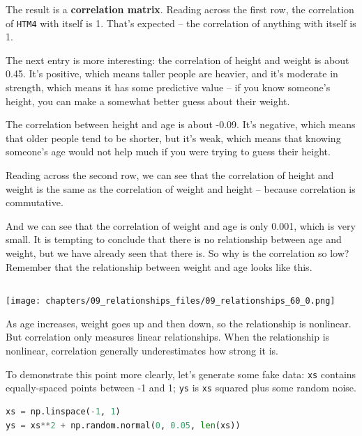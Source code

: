 The result is a \textbf{correlation matrix}. Reading across the first
row, the correlation of \passthrough{\lstinline!HTM4!} with itself is 1.
That's expected -- the correlation of anything with itself is 1.

The next entry is more interesting: the correlation of height and weight
is about 0.45. It's positive, which means taller people are heavier, and
it's moderate in strength, which means it has some predictive value --
if you know someone's height, you can make a somewhat better guess about
their weight.

The correlation between height and age is about -0.09. It's negative,
which means that older people tend to be shorter, but it's weak, which
means that knowing someone's age would not help much if you were trying
to guess their height.

Reading across the second row, we can see that the correlation of height
and weight is the same as the correlation of weight and height --
because correlation is commutative.

And we can see that the correlation of weight and age is only 0.001,
which is very small. It is tempting to conclude that there is no
relationship between age and weight, but we have already seen that there
is. So why is the correlation so low? Remember that the relationship
between weight and age looks like this.

\begin{lstlisting}[language=Python,style=source]
\end{lstlisting}

\begin{center}
\texttt{[image: chapters/09\_relationships\_files/09\_relationships\_60\_0.png]}
\end{center}

As age increases, weight goes up and then down, so the relationship is
nonlinear. But correlation only measures linear relationships. When the
relationship is nonlinear, correlation generally underestimates how
strong it is.

To demonstrate this point more clearly, let's generate some fake data:
\passthrough{\lstinline!xs!} contains equally-spaced points between -1
and 1; \passthrough{\lstinline!ys!} is \passthrough{\lstinline!xs!}
squared plus some random noise.

\begin{lstlisting}[language=Python,style=source]
xs = np.linspace(-1, 1)
ys = xs**2 + np.random.normal(0, 0.05, len(xs))
\end{lstlisting}

